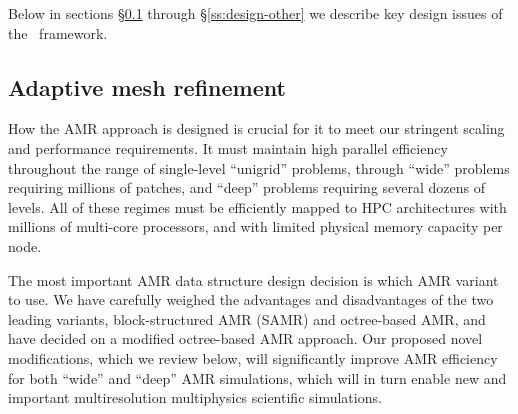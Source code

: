 \documentclass[11pt,letterpaper]{article}
\begin{document}
Below in sections \S\ref{ss:design-amr} through
\S\ref{ss:design-other} we describe key design issues of the \cello\
framework.

\subsection{Adaptive mesh refinement} \label{ss:design-amr}

How the AMR approach is designed is crucial for it to meet our
stringent scaling and performance requirements.  It must maintain high
parallel efficiency throughout the range of single-level ``unigrid''
problems, through ``wide'' problems requiring millions of patches, and
``deep'' problems requiring several dozens of levels.  All of these
regimes must be efficiently mapped to HPC architectures with millions
of multi-core processors, and with limited physical memory capacity
per node.

The most important AMR data structure design decision is which AMR
variant to use.  We have carefully weighed the advantages and
disadvantages of the two leading variants, block-structured AMR (SAMR)
and octree-based AMR, and have decided on a modified octree-based AMR
approach.  Our proposed novel modifications, which we review below, will
significantly improve AMR efficiency for both ``wide'' and ``deep''
AMR simulations, which will in turn enable new and important
multiresolution multiphysics scientific simulations.

\end{document}
